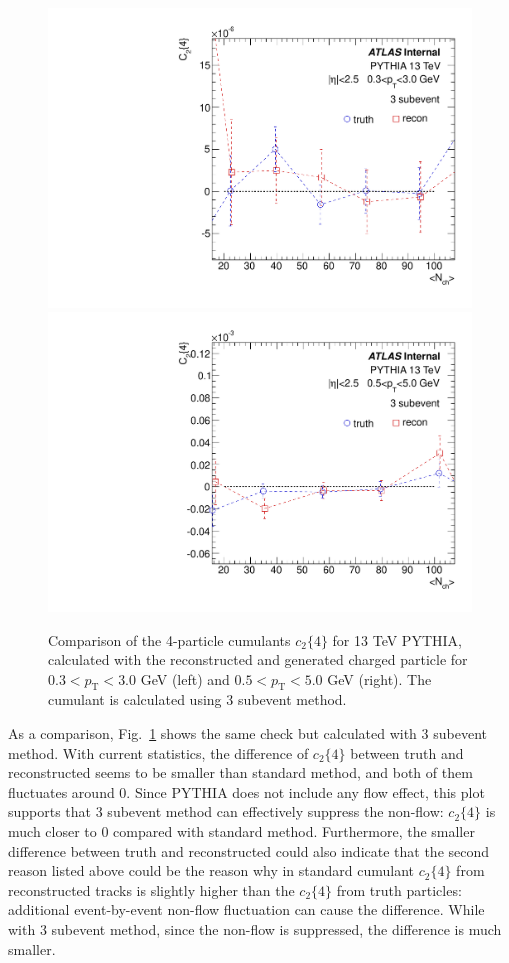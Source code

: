 \begin{figure}[H]
\centering
\includegraphics[width=0.45\linewidth]{figs/sec_sys/pp13/MC_closure_3sub_pt0.pdf}
\includegraphics[width=0.45\linewidth]{figs/sec_sys/pp13/MC_closure_3sub_pt1.pdf}
\caption{Comparison of the 4-particle cumulants $c_{2}\{4\}$ for 13 TeV PYTHIA, calculated with the reconstructed and generated charged particle for $0.3<p_{\text{T}}<3.0$ GeV (left) and $0.5<p_{\text{T}}<5.0$ GeV (right). The cumulant is calculated using 3 subevent method.}
\label{fig:MC_closure_3sub}
\end{figure}

As a comparison, Fig.~\ref{fig:MC_closure_3sub} shows the same check but calculated with 3 subevent method. With current statistics, the difference of $c_{2}\{4\}$ between truth and reconstructed seems to be smaller than standard method, and both of them fluctuates around 0. Since PYTHIA does not include any flow effect, this plot supports that 3 subevent method can effectively suppress the non-flow: $c_{2}\{4\}$ is much closer to 0 compared with standard method. Furthermore, the smaller difference between truth and reconstructed could also indicate that the second reason listed above could be the reason why in standard cumulant $c_{2}\{4\}$ from reconstructed tracks is slightly higher than the $c_{2}\{4\}$ from truth particles: additional event-by-event non-flow fluctuation can cause the difference. While with 3 subevent method, since the non-flow is suppressed, the difference is much smaller.

